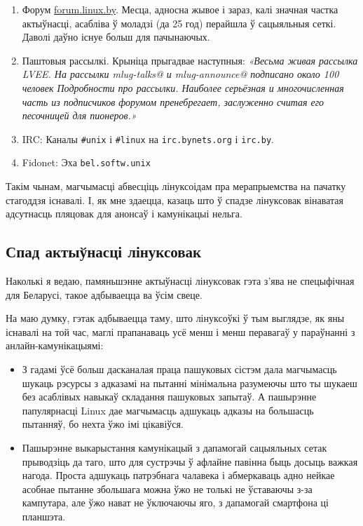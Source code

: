 \documentclass[10pt, a5paper]{article}
\def\v!#1!{\texttt{#1}}
\begin{document}
\begin{enumerate}
  \item Форум \url{forum.linux.by}. Месца, адносна жывое і зараз, калі значная частка актыўнасці, асабліва ў моладзі (да 25 год) перайшла ў сацыяльныя сеткі. Даволі даўно існуе больш для пачынаючых.
  \item Паштовыя рассылкі. Крыніца прыгадвае наступныя: \textit{«Весьма живая рассылка LVEE. На рассылки mlug-talks@ и mlug-announce@ подписано около 100 человек Подробности про рассылки. Наиболее серьёзная и многочисленная часть из подписчиков форумом пренебрегает, заслуженно считая его песочницей для пионеров.»}
  \item IRC: Каналы \v!\#unix! і \v!\#linux! на \v!irc.bynets.org! і \v!irc.by!.
  \item Fidonet: Эха \v!bel.softw.unix!
\end{enumerate}

Такім чынам, магчымасці абвесціць лінуксоідам пра мерапрыемства на пачатку стагоддзя існавалі. І, як мне здаецца, казаць што ў спадзе лінуксовак вінаватая адсутнасць пляцовак для анонсаў і камунікацыі нельга.

\subsection*{Спад актыўнасці лінуксовак}

Наколькі я ведаю, памяньшэнне актыўнасці лінуксовак гэта з'ява не спецыфічная для Беларусі, такое адбываецца ва ўсім свеце.

На маю думку, гэтак адбываецца таму, што лінуксоўкі ў тым выглядзе, як яны існавалі на той час, маглі прапанаваць усё менш і менш перавагаў у параўнанні з анлайн-камунікацыямі:
\begin{itemize}
  \item З гадамі ўсё больш дасканалая праца пашуковых сістэм дала магчымасць шукаць рэсурсы з адказамі на пытанні мінімальна разумеючы што ты шукаеш без асаблівых навыкаў складання пашуковых запытаў. А пашырэнне папулярнасці Linux дае магчымасць адшукаць адказы на большасць пытанняў, бо нехта ўжо імі цікавіўся.
  \item Пашырэнне выкарыстання камунікацый з дапамогай сацыяльных сетак прыводзіць да таго, што для сустрэчы ў афлайне павінна быць досыць важкая нагода. Проста адшукаць патрэбнага чалавека і абмеркаваць адно нейкае асобнае пытанне збольшага можна ўжо не толькі не ўставаючы з-за кампутара, але ўжо нават не ўключаючы яго, з дапамогай смартфона ці планшэта.
\end{itemize}
\end{document}
